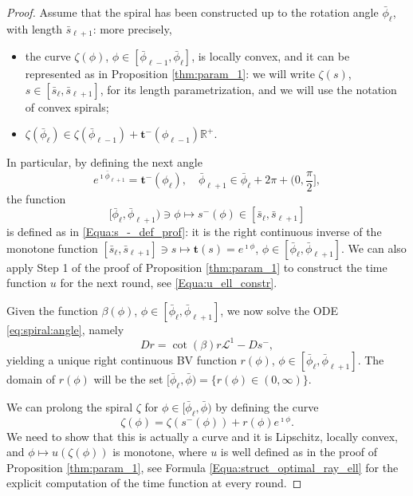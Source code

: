 \documentclass[reqno]{amsart}
\theoremstyle{definition} \newtheorem{definition}{Definition}[section]
\theoremstyle{definition} \newtheorem{remark}[definition]{Remark}
\theoremstyle{plain} \newtheorem{lemma}[definition]{Lemma}
\theoremstyle{plain} \newtheorem{proposition}[definition]{Proposition}
\theoremstyle{plain} \newtheorem{theorem}[definition]{Theorem}
\theoremstyle{plain} \newtheorem{corollary}[definition]{Corollary}
\theoremstyle{definition} \newtheorem{example}[definition]{Example}
\theoremstyle{plain} \newtheorem{claim}[clai]{Claim}
\theoremstyle{definition} \newtheorem{assumption}[definition]{Assumption}
\theoremstyle{definition} \newtheorem{observation}[definition]{Observation}
\newcommand{\R}{\mathbb{R}}
\newcommand{\1}{\mathbbm 1}
\renewcommand{\i}{\imath}
\numberwithin{equation}{section} %
\theoremstyle{plain} \newtheorem*{theorem*}{Theorem}
\theoremstyle{plain} \newtheorem{mthm}[maintheorem]{Main Theorem}
\theoremstyle{plain} \newtheorem*{mthm*}{Main Theorem}
\theoremstyle{plain} \newtheorem*{conjecture*}{Conjecture}
\theoremstyle{plain} \newtheorem{conjecture}[definition]{Conjecture}
\theoremstyle{plain} \newtheorem*{problem*}{Problem}
\begin{document}
\begin{proof}
Assume that the spiral has been constructed up to the rotation angle $\bar \phi_\ell$, with length $\bar s_{\ell+1}$: more precisely,
\begin{itemize}
\item the curve $\zeta(\phi)$, $\phi \in [\bar \phi_{\ell-1},\bar \phi_\ell]$, is locally convex, and it can be represented as in Proposition \ref{thm:param_1}: we will write $\zeta(s)$, $s \in [\bar s_{\ell},\bar s_{\ell+1}]$, for its length parametrization, and we will use the notation of convex spirals;
\item $\zeta(\bar \phi_\ell) \in \zeta(\bar \phi_{\ell-1}) + \mathbf t^-(\phi_{\ell-1}) \R^+$.
\end{itemize}
In particular, by defining the next angle
\begin{equation*}
e^{\i \bar \phi_{\ell+1}} = \mathbf t^-(\phi_\ell), \quad \bar \phi_{\ell+1} \in \bar \phi_\ell + 2\pi + \bigg(0,\frac{\pi}{2} \bigg],
\end{equation*}
the function
$$
[\bar \phi_\ell,\bar \phi_{\ell+1}) \ni \phi \mapsto s^-(\phi) \in [\bar s_{\ell},\bar s_{\ell+1}]
$$
is defined as in \eqref{Equa:s_-_def_prof}: it is the right continuous inverse of the monotone function $[\bar s_\ell,\bar s_{\ell+1}] \ni s \mapsto \mathbf t(s) = e^{\i \phi}$, $\phi \in [\bar \phi_\ell,\bar \phi_{\ell+1}]$. %
We can also apply Step 1 of the proof of Proposition \ref{thm:param_1} to construct the time function $u$ for the next round, see \eqref{Equa:u_ell_constr}.

Given the function $\beta(\phi)$, $\phi \in [\bar \phi_\ell,\bar \phi_{\ell+1}]$, we now solve the ODE \eqref{eq:spiral:angle}, namely
\begin{equation*}
D r = \cot(\beta) r \mathscr L^1 - D s^-,
\end{equation*}
yielding a unique right continuous BV function $r(\phi)$, $\phi \in [\bar \phi_\ell,\bar \phi_{\ell+1}]$. The domain of $r(\phi)$ will be the set $[\bar \phi_\ell,\bar \phi) = \big\{ r(\phi) \in (0,\infty) \big\}$. %

We can prolong the spiral $\zeta$ for $\phi \in [\bar \phi_\ell,\bar \phi)$ by defining the curve
\begin{equation*}
\zeta(\phi) = \zeta(s^-(\phi)) + r(\phi) e^{\i \phi}.
\end{equation*}
We need to show that this is actually a curve and it is Lipschitz, locally convex, and $\phi \mapsto u(\zeta(\phi))$ is monotone, where $u$ is well defined as in the proof of Proposition \ref{thm:param_1}, see Formula \eqref{Equa:struct_optimal_ray_ell} for the explicit computation of the time function at every round.


\end{proof}
\end{document}
